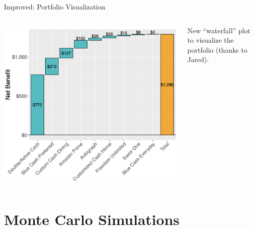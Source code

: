 \begin{frame}{Improved: Portfolio Visualization}
    \begin{columns}[c]
        \begin{column}{0.7\textwidth}
            \includegraphics[width=0.9\textheight]{../Misc/Waterfall_avg_9_0_0.png}
        \end{column}
        \begin{column}{0.3\textwidth}
            \centering
            New ``waterfall'' plot to visualize the portfolio (thanks to Jared). 
        \end{column}
    \end{columns}
\end{frame} 


\section{Monte Carlo Simulations}


